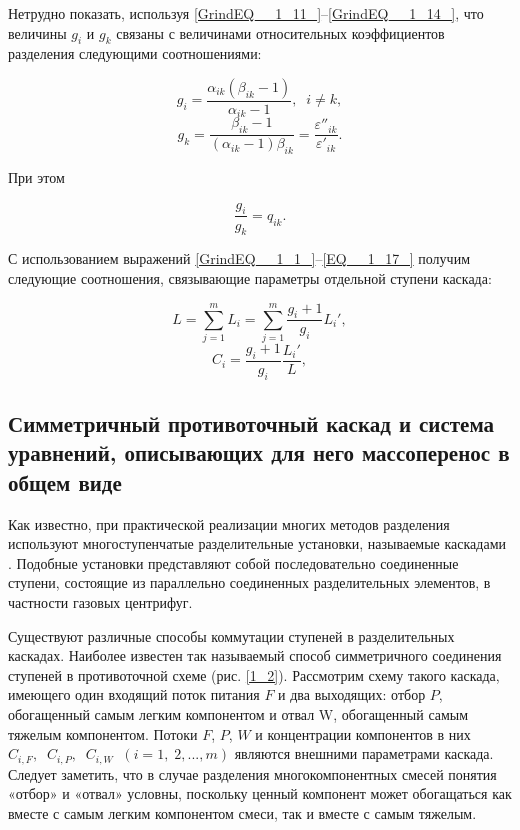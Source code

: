 Нетрудно показать, используя  \ref{GrindEQ__1_11_}--\ref{GrindEQ__1_14_}, что величины $g_{i}$ и $g_{k}$  связаны с величинами относительных коэффициентов разделения следующими соотношениями:

\begin{equation} \label{EQ__1_15_} 
  g_{i} =\frac{\alpha _{ik} (\beta _{ik} -1)}{\alpha _{ik} -1} ,\; \; i\ne k,           
  \end{equation} 
  \begin{equation} \label{EQ__1_16_} 
  g_{k} =\frac{\beta _{ik} -1}{(\alpha _{ik} -1)\beta _{ik} } =\frac{\varepsilon ''_{ik} }{\varepsilon '_{ik} } . 
\end{equation} 

При этом

\begin{equation} \label{EQ__1_17_} 
  \frac{g_{i} }{g_{k} } =q_{ik} .           
\end{equation} 

С использованием выражений \ref{GrindEQ__1_1_}--\ref{EQ__1_17_} получим следующие соотношения, связывающие параметры отдельной ступени каскада:

\begin{equation} \label{GrindEQ__1_18_} 
  L=\sum _{j=1}^{m}L_{i}  =\sum _{j=1}^{m}\frac{g_{i} +1}{g_{i} }  L_{i} ',               
  \end{equation} 
  \begin{equation} \label{GrindEQ__1_19_} 
  C_{i} =\frac{g_{i} +1}{g_{i} } \frac{L_{i} '}{L} ,         
  \end{equation} 
  

\subsection{Симметричный противоточный каскад и система уравнений, описывающих для него массоперенос в общем виде}

Как известно, при практической реализации многих методов разделения используют многоступенчатые разделительные установки, называемые каскадами \cite{sulaberidzeTeoriyaKaskadovDlya2011}. Подобные установки представляют собой последовательно соединенные ступени, состоящие из параллельно соединенных разделительных элементов, в частности газовых центрифуг.

Существуют различные способы коммутации ступеней в разделительных каскадах. Наиболее известен так называемый способ симметричного соединения ступеней в противоточной схеме (рис. \ref{1_2}). Рассмотрим схему такого каскада, имеющего один входящий поток питания $F$ и два выходящих: отбор $P$, обогащенный самым легким компонентом и отвал W, обогащенный самым тяжелым компонентом. Потоки $F$, $P$, $W$ и концентрации компонентов в них $C_{i,F} ,\; \; C_{i,P} ,\; \; C_{i,W} \; \; (i=1,\; 2,...,m)$ являются внешними параметрами каскада. Следует заметить, что в случае разделения многокомпонентных смесей понятия «отбор» и «отвал» условны, поскольку ценный компонент может обогащаться как вместе с самым легким компонентом смеси, так и вместе с самым тяжелым.

